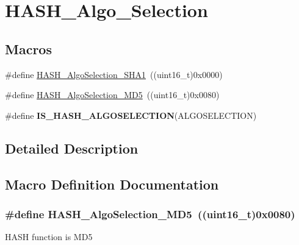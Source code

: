 \hypertarget{group___h_a_s_h___algo___selection}{}\section{H\+A\+S\+H\+\_\+\+Algo\+\_\+\+Selection}
\label{group___h_a_s_h___algo___selection}
\subsection*{Macros}
\begin{DoxyCompactItemize}
\item 
\#define \hyperlink{group___h_a_s_h___algo___selection_gaa866d6ac9e86d2290b012681836f22d0}{H\+A\+S\+H\+\_\+\+Algo\+Selection\+\_\+\+S\+H\+A1}~((uint16\+\_\+t)0x0000)
\item 
\#define \hyperlink{group___h_a_s_h___algo___selection_gac443db7ebfff6d660b9321c59ecf48ed}{H\+A\+S\+H\+\_\+\+Algo\+Selection\+\_\+\+M\+D5}~((uint16\+\_\+t)0x0080)
\item 
\#define {\bfseries I\+S\+\_\+\+H\+A\+S\+H\+\_\+\+A\+L\+G\+O\+S\+E\+L\+E\+C\+T\+I\+O\+N}(A\+L\+G\+O\+S\+E\+L\+E\+C\+T\+I\+O\+N)
\end{DoxyCompactItemize}


\subsection{Detailed Description}


\subsection{Macro Definition Documentation}
\hypertarget{group___h_a_s_h___algo___selection_gac443db7ebfff6d660b9321c59ecf48ed}{}
\subsubsection[{H\+A\+S\+H\+\_\+\+Algo\+Selection\+\_\+\+M\+D5}]{\setlength{\rightskip}{0pt plus 5cm}\#define H\+A\+S\+H\+\_\+\+Algo\+Selection\+\_\+\+M\+D5~((uint16\+\_\+t)0x0080)}\label{group___h_a_s_h___algo___selection_gac443db7ebfff6d660b9321c59ecf48ed}
H\+A\+S\+H function is M\+D5 \hypertarget{group___h_a_s_h___algo___selection_gaa866d6ac9e86d2290b012681836f22d0}{}
